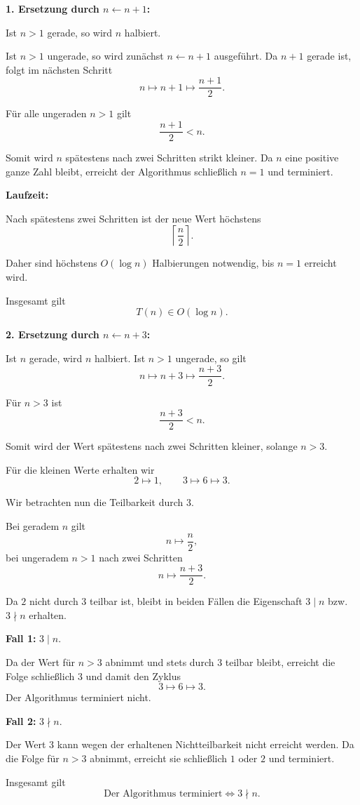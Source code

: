 \documentclass{report}
\begin{document}
\begin{myproof}
  \textbf{1. Ersetzung durch $n\leftarrow n+1$:}

  Ist $n>1$ gerade, so wird $n$ halbiert.

  Ist $n>1$ ungerade, so wird zunächst
  $n\leftarrow n+1$ ausgeführt. Da $n+1$
  gerade ist, folgt im nächsten Schritt
  \[
    n\longmapsto n+1
    \longmapsto\frac{n+1}{2}.
  \]

  Für alle ungeraden $n>1$ gilt
  \[
    \frac{n+1}{2}<n.
  \]

  Somit wird $n$ spätestens nach zwei Schritten
  strikt kleiner. Da $n$ eine positive ganze
  Zahl bleibt, erreicht der Algorithmus
  schließlich $n=1$ und terminiert.

  \medskip
  \textbf{Laufzeit:}

  Nach spätestens zwei Schritten ist der
  neue Wert höchstens
  \[
    \left\lceil\frac n2\right\rceil.
  \]

  Daher sind höchstens $O(\log n)$
  Halbierungen notwendig, bis $n=1$
  erreicht wird.

  Insgesamt gilt
  \[
    \boxed{T(n)\in O(\log n).}
  \]

  \medskip
  \textbf{2. Ersetzung durch $n\leftarrow n+3$:}

  Ist $n$ gerade, wird $n$ halbiert.
  Ist $n>1$ ungerade, so gilt
  \[
    n\longmapsto n+3
    \longmapsto\frac{n+3}{2}.
  \]

  Für $n>3$ ist
  \[
    \frac{n+3}{2}<n.
  \]

  Somit wird der Wert spätestens nach
  zwei Schritten kleiner, solange $n>3$.

  Für die kleinen Werte erhalten wir
  \[
    2\longmapsto1,
    \qquad
    3\longmapsto6\longmapsto3.
  \]

  Wir betrachten nun die Teilbarkeit durch $3$.

  Bei geradem $n$ gilt
  \[
    n\longmapsto\frac n2,
  \]
  bei ungeradem $n>1$ nach zwei Schritten
  \[
    n\longmapsto\frac{n+3}{2}.
  \]

  Da $2$ nicht durch $3$ teilbar ist,
  bleibt in beiden Fällen die Eigenschaft
  $3\mid n$ bzw. $3\nmid n$ erhalten.

  \textbf{Fall 1:} $3\mid n$.

  Da der Wert für $n>3$ abnimmt und stets
  durch $3$ teilbar bleibt, erreicht die
  Folge schließlich $3$ und damit den Zyklus
  \[
    3\longmapsto6\longmapsto3.
  \]
  Der Algorithmus terminiert nicht.

  \textbf{Fall 2:} $3\nmid n$.

  Der Wert $3$ kann wegen der erhaltenen
  Nichtteilbarkeit nicht erreicht werden.
  Da die Folge für $n>3$ abnimmt,
  erreicht sie schließlich $1$ oder $2$
  und terminiert.

  Insgesamt gilt
  \[
    \boxed{
      \text{Der Algorithmus terminiert}
      \iff 3\nmid n.
    }
  \]
\end{myproof}
\end{document}
